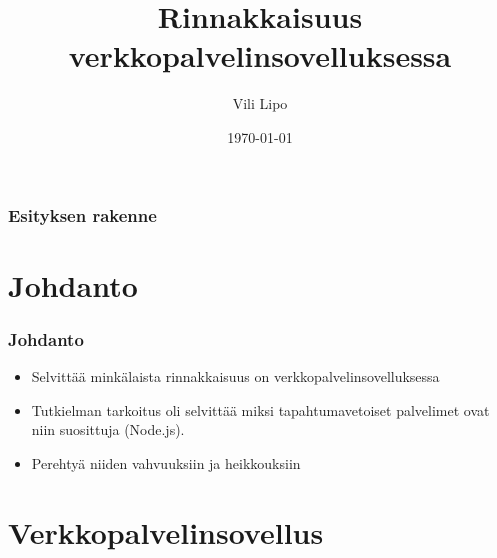 \documentclass{beamer}
\title{Rinnakkaisuus verkkopalvelinsovelluksessa}
\author{Vili Lipo}
\institute{Helsingin Yliopisto}
\date{\today}
\begin{document}
\begin{frame}
  \titlepage
\end{frame}
\begin{frame}
  \frametitle{Esityksen rakenne}
  \tableofcontents
\end{frame}
\section{Johdanto}
\begin{frame}
  \frametitle{Johdanto}
  \begin{itemize}
    \item Selvittää minkälaista rinnakkaisuus on verkkopalvelinsovelluksessa
    \item Tutkielman tarkoitus oli selvittää miksi tapahtumavetoiset palvelimet
      ovat niin suosittuja (Node.js).
    \item Perehtyä niiden vahvuuksiin ja heikkouksiin
  \end{itemize}
\end{frame}
\section{Verkkopalvelinsovellus}
\end{document}
